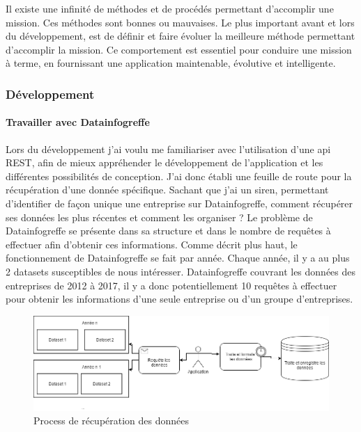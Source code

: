 \documentclass[french]{article}
\begin{document}
{Il existe une infinité de méthodes et de procédés permettant d'accomplir une mission. Ces méthodes sont bonnes ou mauvaises. Le plus important avant et lors du développement, est de définir et faire évoluer la meilleure méthode permettant d'accomplir la mission. Ce comportement est essentiel pour conduire une mission à terme, en fournissant une application maintenable, évolutive et intelligente.
\subsubsection{Développement}

\paragraph{Travailler avec Datainfogreffe}

Lors du développement j'ai voulu me familiariser avec l'utilisation d'une api REST, afin de mieux appréhender le développement de l'application et les différentes possibilités de conception. J'ai donc établi une feuille de route pour la récupération d'une donnée spécifique. Sachant que j'ai un siren, permettant d'identifier de façon unique une entreprise sur Datainfogreffe, comment récupérer ses données les plus récentes et comment les organiser ?
\newline{}
Le problème de Datainfogreffe se présente dans sa structure et dans le nombre de requêtes à effectuer afin d'obtenir ces informations. Comme décrit plus haut, le fonctionnement de Datainfogreffe se fait par année. Chaque année, il y a au plus 2 datasets susceptibles de nous intéresser. Datainfogreffe couvrant les données des entreprises de 2012 à 2017, il y a donc potentiellement 10 requêtes à effectuer pour obtenir les informations d'une seule entreprise ou d'un groupe d'entreprises.

\begin{figure}[ht]
\centering
\includegraphics[width=\textwidth, draft=false]{api_diagram.png}
\caption{Process de récupération des données}
\label{fig2}
\end{figure}

}
\end{document}
